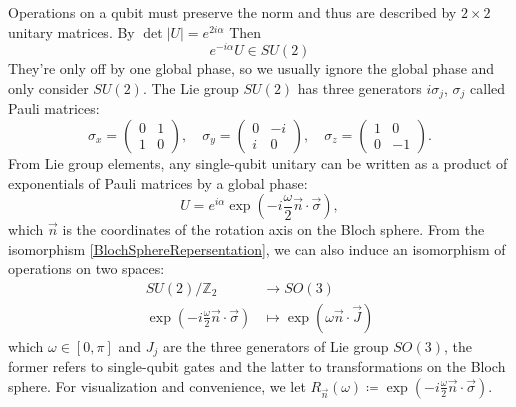 \documentclass[a4paper,10pt]{book}
\numberwithin{equation}{section}
\begin{document}
Operations on a qubit must preserve the norm and thus are described by $2\times2$ unitary matrices. By $\det|U|=e^{2i\alpha}$ Then
\begin{equation}
    e^{-i\alpha}U\in SU(2)
\end{equation}
They're only off by one global phase, so we usually ignore the global phase and only consider $SU(2)$. The Lie group $SU(2)$ has three generators $i\sigma_j$, $\sigma_j$ called Pauli matrices:
\begin{equation}
    \sigma_x = \begin{pmatrix} 0 & 1 \\ 1 & 0 \end{pmatrix}, \quad
    \sigma_y = \begin{pmatrix} 0 & -i \\ i & 0 \end{pmatrix}, \quad
    \sigma_z = \begin{pmatrix} 1 & 0 \\ 0 & -1 \end{pmatrix}.
\end{equation}
From Lie group elements, any single-qubit unitary can be written as a product of exponentials of Pauli matrices by a global phase:
\begin{equation}
    U = e^{i\alpha}\exp\left(-i\frac{\omega}{2}\vec{n}\cdot\vec{\sigma}\right),
\end{equation}
which $\vec{n}$ is the coordinates of the rotation axis on the Bloch sphere.
From the isomorphism \ref{BlochSphereRepersentation}, we can also induce an isomorphism of operations on two spaces:
\begin{equation}
    \begin{split}
        SU(2)/\mathbb{Z}_{2}                                        & \to SO(3)
        \\
        \exp\left(-i\frac{\omega}{2}\vec{n}\cdot\vec{\sigma}\right) & \mapsto \exp\left(\omega\vec{n}\cdot\vec{J}\right)
    \end{split}
\end{equation}
which $\omega\in\left[0,\pi\right]$ and $J_{j}$ are the three generators of Lie group $SO(3)$, the former refers to single-qubit gates and the latter to transformations on the Bloch sphere. For visualization and convenience, we let $R_{\vec{n}}(\omega) \coloneqq \exp\left(-i\frac{\omega}{2}\vec{n}\cdot\vec{\sigma}\right)$.
\end{document}
